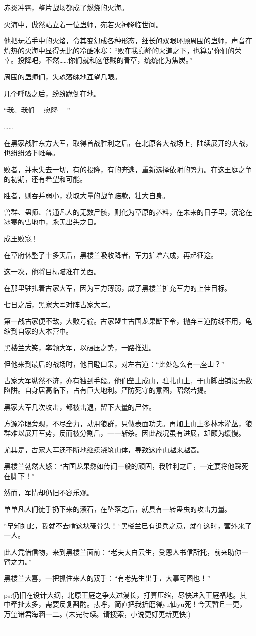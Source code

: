 \begin{this_body}
赤炎冲霄，整片战场都成了燃烧的火海。

火海中，傲然站立着一位蛊师，宛若火神降临世间。

他把玩着手中的火焰，令其变幻成各种形态，细长的双眼环顾周围的蛊师，声音在灼热的火海中显得无比的冷酷冰寒：“败在我巅峰的火道之下，也算是你们的荣幸。投降吧，不然……你们就和这低贱的青草，统统化为焦炭。”

周围的蛊师们，失魂落魄地互望几眼。

几个呼吸之后，纷纷跪倒在地。

“我、我们……愿降……”

……

在黑家战胜东方大军，取得首战胜利之后，在北原各大战场上，陆续展开的大战，也纷纷落下帷幕。

败者，并未失去一切，有的投降，有的奔逃，重新选择依附的势力。在这王庭之争的初期，还有希望和可能。

胜者，则吞并弱小，获取大量的战争赔款，壮大自身。

兽群、蛊师、普通凡人的无数尸骸，则化为草原的养料，在未来的日子里，沉沦在冰寒的雪地中，永无出头之日。

成王败寇！

在草府休整了十多天后，黑楼兰吸收降者，军力扩增六成，再起征途。

这一次，他将目标瞄准在关西。

在那里驻扎着古家大军，因为军力薄弱，成了黑楼兰扩充军力的上佳目标。

七日之后，黑家大军对阵古家大军。

第一战古家便不敌，大败亏输。古家盟主古国龙果断下令，抛弃三道防线不用，龟缩到自家的大本营中。

黑楼兰大笑，率领大军，以碾压之势，一路推进。

但他来到最后的战场时，他目瞪口呆，对左右道：“此处怎么有一座山？”

古家大军纵然不济，亦有独到手段。他们垒土成山，驻扎山上，于山脚出铺设无数陷阱。自身居高临下，占有巨大地利。严防死守的意图，昭然若揭。

黑家大军几次攻击，都被击退，留下大量的尸体。

方源冷眼旁观，不尽全力，动用狼群，只做表面功夫。再加上山上多林木灌丛，狼群难以展开军势，反而被分割后，一一斩杀。因此战况虽有进展，却颇为缓慢。

尤其是，古家大军还不断地继续浇筑山体，导致这座山越来越高。

黑楼兰勃然大怒：“古国龙果然如传闻一般的顽固，我胜利之后，一定要将他踩死在脚下！”

然而，军情却仍旧不容乐观。

单单凡人们徒手扔下来的滚石，在坠落之后，就具有一转蛊虫的攻击力量。

“早知如此，我就不去啃这块硬骨头！”黑楼兰已有退兵之意，就在这时，营外来了一人。

此人凭借信物，来到黑楼兰面前：“老夫太白云生，受恩人书信所托，前来助你一臂之力。”

黑楼兰大喜，一把抓住来人的双手：“有老先生出手，大事可图也！”

ps:仍旧在设计大纲，北原王庭之争太过漫长，打算压缩，尽快进入王庭福地。其中牵扯太多，需要反复斟酌。悲呼，简直把我折磨得yu仙yu死！今天暂且一更，万望诸君海涵一二。(未完待续。请搜索，小说更好更新更快!)

------------

\end{this_body}

